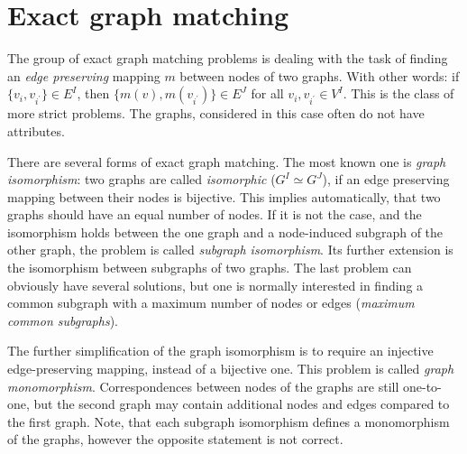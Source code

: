 \section{Exact graph matching}
The group of exact graph matching problems is dealing with the task of finding an \emph{edge preserving} mapping $m$ between nodes of two graphs. With other words: if $\{v_i,v_{i^\prime}\}\in E^I$, then $\{m(v),m(v_{i^\prime})\}\in E^J$ for all $v_i,v_{i^\prime}\in V^I$. This is the class of more strict problems. The graphs, considered in this case often do not have attributes.

There are several forms of exact graph matching. The most known one is \emph{graph isomorphism}: two graphs are called \emph{isomorphic} ($G^I\simeq G^J$), if an edge preserving mapping between their nodes is bijective. This implies automatically, that two graphs should have an equal number of nodes. If it is not the case, and the isomorphism holds between the one graph and a node-induced subgraph of the other graph, the problem is called \emph{subgraph isomorphism}. Its further extension is the isomorphism between subgraphs of two graphs. The last problem can obviously have several solutions, but one is normally interested in finding a common subgraph with a maximum number of nodes or edges (\emph{maximum common subgraphs}).  

The further simplification of the graph isomorphism is to require an injective edge-preserving mapping, instead of a bijective one. This problem is called \emph{graph monomorphism}. Correspondences between nodes of the graphs are still one-to-one, but the second graph may contain additional nodes and edges compared to the first graph. Note, that each subgraph isomorphism defines a monomorphism of the graphs, however the opposite statement is not correct.


